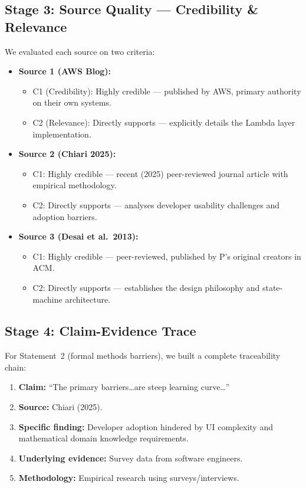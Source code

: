 \documentclass[11pt, a4paper]{article}
\begin{document}
\subsection{Stage 3: Source Quality --- Credibility \& Relevance}
We evaluated each source on two criteria:

\begin{itemize}[nosep]
    \item \textbf{Source 1 (AWS Blog):}
    \begin{itemize}[nosep]
        \item C1 (Credibility): Highly credible --- published by AWS, primary authority on their own systems.
        \item C2 (Relevance): Directly supports --- explicitly details the Lambda layer implementation.
    \end{itemize}
    
    \item \textbf{Source 2 (Chiari 2025):}
    \begin{itemize}[nosep]
        \item C1: Highly credible --- recent (2025) peer-reviewed journal article with empirical methodology.
        \item C2: Directly supports --- analyses developer usability challenges and adoption barriers.
    \end{itemize}
    
    \item \textbf{Source 3 (Desai et al.\ 2013):}
    \begin{itemize}[nosep]
        \item C1: Highly credible --- peer-reviewed, published by P's original creators in ACM.
        \item C2: Directly supports --- establishes the design philosophy and state-machine architecture.
    \end{itemize}
\end{itemize}

\subsection{Stage 4: Claim-Evidence Trace}
For Statement~2 (formal methods barriers), we built a complete traceability chain:

\begin{enumerate}[nosep]
    \item \textbf{Claim:} ``The primary barriers\ldots are steep learning curve\ldots''
    \item[$\downarrow$] \textbf{Source:} Chiari (2025).
    \item[$\downarrow$] \textbf{Specific finding:} Developer adoption hindered by UI complexity and mathematical domain knowledge requirements.
    \item[$\downarrow$] \textbf{Underlying evidence:} Survey data from software engineers.
    \item[$\downarrow$] \textbf{Methodology:} Empirical research using surveys/interviews.
\end{enumerate}
\end{document}
